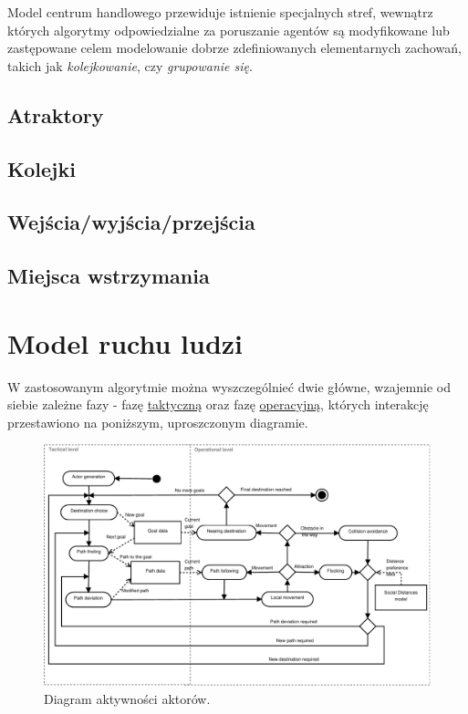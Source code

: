\documentclass[a4paper, 12pt]{article}
\begin{document}
Model centrum handlowego przewiduje istnienie specjalnych stref, wewnątrz których algorytmy odpowiedzialne za poruszanie agentów są modyfikowane lub zastępowane celem modelowanie dobrze zdefiniowanych elementarnych zachowań, takich jak \textit{kolejkowanie}, czy \textit{grupowanie się}.


    \subsection{Atraktory}
    \label{sec:attractors}

    \subsection{Kolejki}
    \label{sec:queues}

    \subsection{Wejścia/wyjścia/przejścia}
    \label{sec:entrance-exits}

    \subsection{Miejsca wstrzymania}
    \label{sec:holders}

\newpage
    \section{Model ruchu ludzi}
    \label{sec:move-model}

\noindent
W zastosowanym algorytmie można wyszczególnieć dwie główne, wzajemnie od siebie zależne fazy - fazę \hyperref[sec:tactical]{taktyczną} oraz fazę \hyperref[sec:operational]{operacyjną}, których interakcję przestawiono na poniższym, uproszczonym diagramie.

    \begin{figure}[h!]
        \centering
        \includegraphics[scale=0.7]{./img/ActorActivity.pdf}
        \caption{Diagram aktywności aktorów.}
        \label{fig:actor-activity}
    \end{figure}
\end{document}
